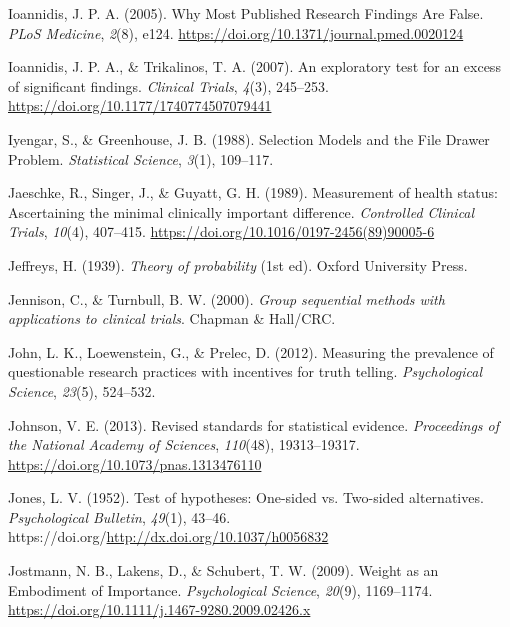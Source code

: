 \documentclass[
  oneside]{krantz}
\newlength{\cslhangindent}
\newlength{\cslentryspacingunit} %
\newenvironment{CSLReferences}[2] %
 {%
  \setlength{\parindent}{0pt}
  \ifodd #1
  \let\oldpar\par
  \def\par{\hangindent=\cslhangindent\oldpar}
  \fi
  \setlength{\parskip}{#2\cslentryspacingunit}
 }%
 {}
\begin{document}
\begin{CSLReferences}{1}{0}
\leavevmode{}%
Ioannidis, J. P. A. (2005). Why {Most Published Research Findings Are
False}. \emph{PLoS Medicine}, \emph{2}(8), e124.
\url{https://doi.org/10.1371/journal.pmed.0020124}

\leavevmode{}%
Ioannidis, J. P. A., \& Trikalinos, T. A. (2007). An exploratory test
for an excess of significant findings. \emph{Clinical Trials},
\emph{4}(3), 245--253. \url{https://doi.org/10.1177/1740774507079441}

\leavevmode{}%
Iyengar, S., \& Greenhouse, J. B. (1988). Selection {Models} and the
{File Drawer Problem}. \emph{Statistical Science}, \emph{3}(1),
109--117.

\leavevmode{}%
Jaeschke, R., Singer, J., \& Guyatt, G. H. (1989). Measurement of health
status: {Ascertaining} the minimal clinically important difference.
\emph{Controlled Clinical Trials}, \emph{10}(4), 407--415.
\url{https://doi.org/10.1016/0197-2456(89)90005-6}

\leavevmode{}%
Jeffreys, H. (1939). \emph{Theory of probability} (1st ed). {Oxford
University Press}.

\leavevmode{}%
Jennison, C., \& Turnbull, B. W. (2000). \emph{Group sequential methods
with applications to clinical trials}. {Chapman \& Hall/CRC}.

\leavevmode{}%
John, L. K., Loewenstein, G., \& Prelec, D. (2012). Measuring the
prevalence of questionable research practices with incentives for truth
telling. \emph{Psychological Science}, \emph{23}(5), 524--532.

\leavevmode{}%
Johnson, V. E. (2013). Revised standards for statistical evidence.
\emph{Proceedings of the National Academy of Sciences}, \emph{110}(48),
19313--19317. \url{https://doi.org/10.1073/pnas.1313476110}

\leavevmode{}%
Jones, L. V. (1952). Test of hypotheses: One-sided vs. Two-sided
alternatives. \emph{Psychological Bulletin}, \emph{49}(1), 43--46.
https://doi.org/\url{http://dx.doi.org/10.1037/h0056832}

\leavevmode{}%
Jostmann, N. B., Lakens, D., \& Schubert, T. W. (2009). Weight as an
{Embodiment} of {Importance}. \emph{Psychological Science},
\emph{20}(9), 1169--1174.
\url{https://doi.org/10.1111/j.1467-9280.2009.02426.x}


\end{CSLReferences}
\end{document}
